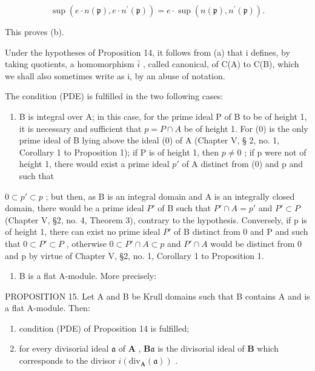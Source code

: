 \[
\sup (e \cdot n (\mathfrak {p}), e \cdot n ^ {\prime} (\mathfrak {p})) = e \cdot \sup (n (\mathfrak {p}), n ^ {\prime} (\mathfrak {p})).
\]

This proves (b).

Under the hypotheses of Proposition 14, it follows from (a) that i defines, by taking quotients, a homomorphism \(\bar{i}\) , called canonical, of C(A) to C(B), which we shall also sometimes write as i, by an abuse of notation.

The condition (PDE) is fulfilled in the two following cases:

\begin{enumerate}
\def\labelenumi{(\arabic{enumi})}
\tightlist
\item
  B is integral over A; in this case, for the prime ideal P of B to be of height 1, it is necessary and sufficient that \(p = P \cap A\) be of height 1. For (0) is the only prime ideal of B lying above the ideal (0) of A (Chapter V, § 2, no. 1, Corollary 1 to Proposition 1); if P is of height 1, then \(p \neq 0\) ; if p were not of height 1, there would exist a prime ideal \(p'\) of A distinct from (0) and p and such that
\end{enumerate}

\(0 \subset p' \subset p\) ; but then, as B is an integral domain and A is an integrally closed domain, there would be a prime ideal \(P'\) of B such that \(P' \cap A = p'\) and \(P' \subset P\) (Chapter V, §2, no. 4, Theorem 3), contrary to the hypothesis. Conversely, if p is of height 1, there can exist no prime ideal \(P'\) of B distinct from 0 and P and such that \(0 \subset P' \subset P\) , otherwise \(0 \subset P' \cap A \subset p\) and \(P' \cap A\) would be distinct from 0 and p by virtue of Chapter V, §2, no. 1, Corollary 1 to Proposition 1.

\begin{enumerate}
\def\labelenumi{(\arabic{enumi})}
\setcounter{enumi}{1}
\tightlist
\item
  B is a flat A-module. More precisely:
\end{enumerate}

PROPOSITION 15. Let A and B be Krull domains such that B contains A and is a flat A-module. Then:

\begin{enumerate}
\def\labelenumi{(\alph{enumi})}
\item
  condition (PDE) of Proposition 14 is fulfilled;
\item
  for every divisorial ideal \(\mathfrak{a}\) of \(\mathbf{A}\) , \(\mathbf{B}\mathfrak{a}\) is the divisorial ideal of \(\mathbf{B}\) which corresponds to the divisor \(i(\mathrm{div}_{\mathbf{A}}(\mathfrak{a}))\) .
\end{enumerate}

